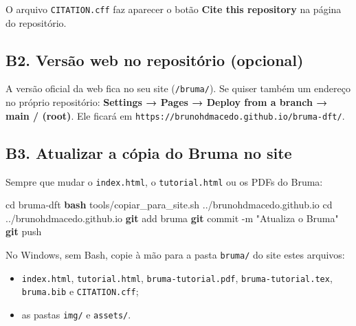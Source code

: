 \documentclass[
  10pt,
]{article}
\newenvironment{Shaded}{\begin{snugshade}}{\end{snugshade}}
\newcommand{\AttributeTok}[1]{\textcolor[rgb]{0.13,0.29,0.53}{#1}}
\newcommand{\BuiltInTok}[1]{#1}
\newcommand{\FunctionTok}[1]{\textcolor[rgb]{0.13,0.29,0.53}{\textbf{#1}}}
\newcommand{\NormalTok}[1]{#1}
\newcommand{\StringTok}[1]{\textcolor[rgb]{0.31,0.60,0.02}{#1}}
\providecommand{\tightlist}{%
  \setlength{\itemsep}{0pt}\setlength{\parskip}{0pt}}
\begin{document}
O arquivo \texttt{CITATION.\allowbreak{}cff} faz aparecer o botão
\textbf{Cite this repository} na página do repositório.

\hypertarget{b2.-versuxe3o-web-no-reposituxf3rio-opcional}{%
\subsection{B2. Versão web no repositório
(opcional)}\label{b2.-versuxe3o-web-no-reposituxf3rio-opcional}}

A versão oficial da web fica no seu site
(\texttt{/\allowbreak{}bruma/\allowbreak{}}). Se quiser também um
endereço no próprio repositório: \textbf{Settings → Pages → Deploy from
a branch → main / (root)}. Ele ficará em
\texttt{https:\allowbreak{}/\allowbreak{}/\allowbreak{}brunohdmacedo.\allowbreak{}github.\allowbreak{}io/\allowbreak{}bruma-\allowbreak{}dft/\allowbreak{}}.

\hypertarget{b3.-atualizar-a-cuxf3pia-do-bruma-no-site}{%
\subsection{B3. Atualizar a cópia do Bruma no
site}\label{b3.-atualizar-a-cuxf3pia-do-bruma-no-site}}

Sempre que mudar o \texttt{index.\allowbreak{}html}, o
\texttt{tutorial.\allowbreak{}html} ou os PDFs do Bruma:

\begin{Shaded}
\begin{Highlighting}[]
\BuiltInTok{cd}\NormalTok{ bruma{-}dft}
\FunctionTok{bash}\NormalTok{ tools/copiar\_para\_site.sh ../brunohdmacedo.github.io}
\BuiltInTok{cd}\NormalTok{ ../brunohdmacedo.github.io}
\FunctionTok{git}\NormalTok{ add bruma}
\FunctionTok{git}\NormalTok{ commit }\AttributeTok{{-}m} \StringTok{"Atualiza o Bruma"}
\FunctionTok{git}\NormalTok{ push}
\end{Highlighting}
\end{Shaded}

No Windows, sem Bash, copie à mão para a pasta
\texttt{bruma/\allowbreak{}} do site estes arquivos:

\begin{itemize}
\tightlist
\item
  \texttt{index.\allowbreak{}html}, \texttt{tutorial.\allowbreak{}html},
  \texttt{bruma-\allowbreak{}tutorial.\allowbreak{}pdf},
  \texttt{bruma-\allowbreak{}tutorial.\allowbreak{}tex},
  \texttt{bruma.\allowbreak{}bib} e \texttt{CITATION.\allowbreak{}cff};
\item
  as pastas \texttt{img/\allowbreak{}} e \texttt{assets/\allowbreak{}}.
\end{itemize}
\end{document}
